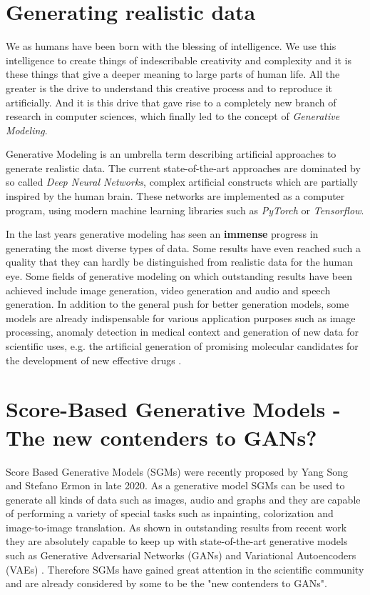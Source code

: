 
\section{Generating realistic data} %
\thispagestyle{plain}
We as humans have been born with the blessing of intelligence. We use this intelligence to create things of indescribable creativity and complexity and it is these things that give a deeper meaning to large parts of human life. All the greater is the drive to understand this creative process and to reproduce it artificially. And it is this drive that gave rise to a completely new branch of research in computer sciences, which finally led to the concept of \textit{Generative Modeling}.

\thispagestyle{plain}
Generative Modeling is an umbrella term describing artificial approaches to generate realistic data. The current state-of-the-art approaches are dominated by so called \textit{Deep Neural Networks}, complex artificial constructs which are partially inspired by the human brain. These networks are implemented as a computer program, using modern machine learning libraries such as \textit{PyTorch} or \textit{Tensorflow}.

\thispagestyle{plain}
In the last years generative modeling has seen an \textbf{immense} progress in generating the most diverse types of data. Some results have even reached such a quality that they can hardly be distinguished from realistic data for the human eye. Some fields of generative modeling on which outstanding results have been achieved include image generation, video generation and audio and speech generation. In addition to the general push for better generation models, some models are already indispensable for various application purposes such as image processing, anomaly detection in medical context and generation of new data for scientific uses, e.g. the artificial generation of promising molecular candidates for the development of new effective drugs \cite{molgrad}.
\thispagestyle{plain}
\section{Score-Based Generative Models - The new contenders to GANs?} 
\thispagestyle{plain}
Score Based Generative Models (SGMs) were recently proposed by Yang Song and Stefano Ermon \cite{score_1} in late 2020. As a generative model SGMs can be used to generate all kinds of data such as images, audio and graphs and they are capable of performing a variety of special tasks such as inpainting, colorization and image-to-image translation. As shown in outstanding results from recent work \cite{score_3} they are absolutely capable to keep up with state-of-the-art generative models such as Generative Adversarial Networks (GANs) \cite{gan_original} and Variational Autoencoders (VAEs) \cite{vae_original}. Therefore SGMs have gained great attention in the scientific community and are already considered by some to be the "new contenders to GANs".

